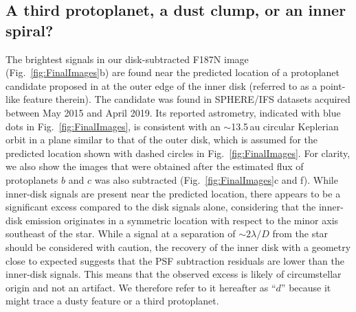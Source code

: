 \documentclass[longauth]{aa}
\begin{document}
\subsection{A third protoplanet, a dust clump, or an inner spiral?}

The brightest signals in our disk-subtracted F187N image (Fig.~\ref{fig:FinalImages}b) are found near the predicted location of a protoplanet candidate proposed in  at the outer edge of the inner disk (referred to as a point-like feature therein). The candidate was found in SPHERE/IFS datasets acquired between May 2015 and April 2019. Its reported astrometry, indicated with blue dots in Fig.~\ref{fig:FinalImages}, is consistent with an $\sim$13.5\,au circular Keplerian orbit in a plane similar to that of the outer disk, which %
is assumed for the predicted location shown with dashed circles in Fig.~\ref{fig:FinalImages}. %
For clarity, we also show the images that were obtained after the estimated flux of protoplanets $b$ and $c$ was also subtracted (Fig.~\ref{fig:FinalImages}c and f).
While inner-disk signals are present near the predicted location, there appears to be a significant excess compared to the disk signals alone, considering that 
the inner-disk emission originates in a symmetric location with respect to the minor axis %
southeast of the star. 
While a signal at a separation of $\sim$$2\lambda/D$ from the star should be considered with caution, the recovery of the inner disk with a geometry close to expected suggests that the PSF subtraction residuals are lower than the inner-disk signals. %
This means that the observed excess is likely %
of 
circumstellar origin and not an %
artifact.
We therefore refer to it hereafter as ``$d$'' because it might trace a dusty feature or a third protoplanet. 
\end{document}
